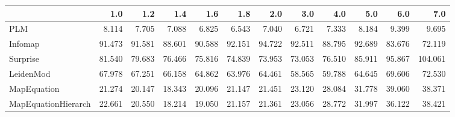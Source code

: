 \begin{tabular}{lrrrrrrrrrrr}
\toprule
{} &    1.0 &    1.2 &    1.4 &    1.6 &    1.8 &    2.0 &    3.0 &    4.0 &    5.0 &    6.0 &     7.0 \\
\midrule
PLM                 &  8.114 &  7.705 &  7.088 &  6.825 &  6.543 &  7.040 &  6.721 &  7.333 &  8.184 &  9.399 &   9.695 \\
Infomap             & 91.473 & 91.581 & 88.601 & 90.588 & 92.151 & 94.722 & 92.511 & 88.795 & 92.689 & 83.676 &  72.119 \\
Surprise            & 81.540 & 79.683 & 76.466 & 75.816 & 74.839 & 73.953 & 73.053 & 76.510 & 85.911 & 95.867 & 104.061 \\
LeidenMod           & 67.978 & 67.251 & 66.158 & 64.862 & 63.976 & 64.461 & 58.565 & 59.788 & 64.645 & 69.606 &  72.530 \\
MapEquation         & 21.274 & 20.147 & 18.343 & 20.096 & 21.147 & 21.451 & 23.120 & 28.084 & 31.778 & 39.060 &  38.371 \\
MapEquationHierarch & 22.661 & 20.550 & 18.214 & 19.050 & 21.157 & 21.361 & 23.056 & 28.772 & 31.997 & 36.122 &  38.421 \\
\bottomrule
\end{tabular}
